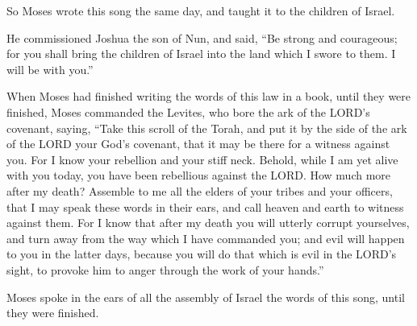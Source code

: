 \myverse{}So Moses wrote this song the same day, and taught it to the
children of Israel.

\myverse{}He commissioned Joshua the son of Nun, and said, “Be strong
and courageous; for you shall bring the children of Israel into the land which I swore to them. I will
be with you.”

\myverse{}When Moses had finished writing the words of this law in a book,
until they were finished,
\myverse{}Moses commanded the Levites, who bore the ark of the LORD’s covenant, saying,
\myverse{}“Take this scroll of the Torah, and put it by the side of the ark of the
LORD your God’s covenant, that it may be there for a witness against you.
\myverse{}For I know your rebellion and your stiff neck. Behold, while I am yet alive
with you today, you have been rebellious against the LORD. How much more after my death?
\myverse{}Assemble to me all the elders of your tribes and your officers, that I may
speak these words in their ears, and call heaven and earth to witness against them.
\myverse{}For I know that after my death you will utterly corrupt yourselves, and turn
away from the way which I have commanded you; and evil will happen to you in the latter days, because
you will do that which is evil in the LORD’s sight, to provoke him to anger through the work of your hands.”

\myverse{}Moses spoke in the ears of all the assembly of Israel the words
of this song, until they were finished.

